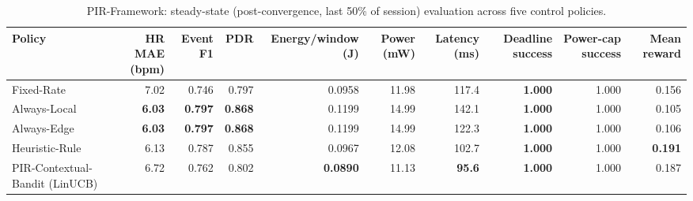 \begin{table}[t]
\centering
\caption{PIR-Framework: steady-state (post-convergence, last 50\% of session) evaluation across five control policies.}
\label{tab:pir_overall}
\begin{tabular}{lrrrrrrrrr}
\toprule
Policy & HR MAE (bpm) & Event F1 & PDR & Energy/window (J) & Power (mW) & Latency (ms) & Deadline success & Power-cap success & Mean reward \\
\midrule
Fixed-Rate & 7.02 & 0.746 & 0.797 & 0.0958 & 11.98 & 117.4 & \textbf{1.000} & 1.000 & 0.156 \\
Always-Local & \textbf{6.03} & \textbf{0.797} & \textbf{0.868} & 0.1199 & 14.99 & 142.1 & \textbf{1.000} & 1.000 & 0.105 \\
Always-Edge & \textbf{6.03} & \textbf{0.797} & \textbf{0.868} & 0.1199 & 14.99 & 122.3 & \textbf{1.000} & 1.000 & 0.106 \\
Heuristic-Rule & 6.13 & 0.787 & 0.855 & 0.0967 & 12.08 & 102.7 & \textbf{1.000} & 1.000 & \textbf{0.191} \\
PIR-Contextual-Bandit (LinUCB) & 6.72 & 0.762 & 0.802 & \textbf{0.0890} & 11.13 & \textbf{95.6} & \textbf{1.000} & 1.000 & 0.187 \\
\bottomrule
\end{tabular}
\end{table}